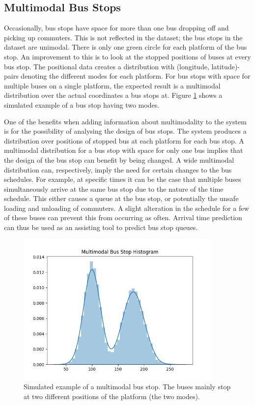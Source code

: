 \subsection{Multimodal Bus Stops}
Occasionally, bus stops have space for more than one bus dropping off and picking up commuters.
This is not reflected in the dataset; the bus stops in the dataset are unimodal.
There is only one green circle for each platform of the bus stop.
An improvement to this is to look at the stopped positions of buses at every bus stop.
The positional data creates a distribution with (longitude, latitude)-pairs denoting the different modes for each platform.
For bus stops with space for multiple buses on a single platform, the expected result is a multimodal distribution over the actual coordinates a bus stops at.
Figure \ref{fig:multimodal-stops} shows a simulated example of a bus stop having two modes.

One of the benefits when adding information about multimodality to the system is for the possibility of analysing the design of bus stops.
The system produces a distribution over positions of stopped bus at each platform for each bus stop.
A multimodal distribution for a bus stop with space for only one bus implies that the design of the bus stop can benefit by being changed.
A wide multimodal distribution can, respectively, imply the need for certain changes to the bus schedules.
For example, at specific times it can be the case that multiple buses simultaneously arrive at the same bus stop due to the nature of the time schedule.
This either causes a queue at the bus stop, or potentially the unsafe loading and unloading of commuters.
A slight alteration in the schedule for a few of these buses can prevent this from occurring as often.
Arrival time prediction can thus be used as an assisting tool to predict bus stop queues.

\begin{figure}[t!]
    \centering
    \includegraphics[width=0.9\textwidth]{figures/multimodal_bus_stops}
    \caption[Simulated example of a multimodal bus stop]%
    {{\small Simulated example of a multimodal bus stop.
    The buses mainly stop at two different positions of the platform (the two modes).
    }}
    \label{fig:multimodal-stops}
\end{figure}